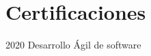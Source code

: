 \documentclass[]{cv-class}
\begin{document}
\section{Certificaciones}
\begin{entrylist}
	\entry
	{2020}
	{Desarrollo Ágil de software}
	{ }
	{\href{https://drive.google.com/file/d/1Exu_C3WSs1GdBZsTsl7TQbTIOxiHJco7/view?usp=sharing}
{}}
	

\end{entrylist}
\end{document}
